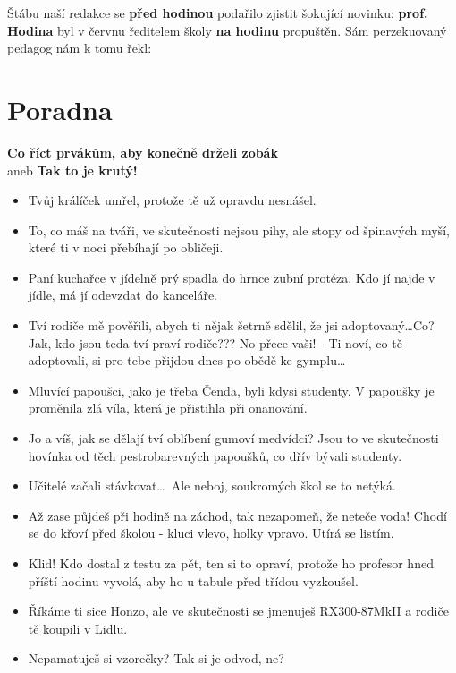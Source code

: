 \documentclass[twoside, 11pt]{article}
\begin{document}
Štábu naší redakce se \textbf{před hodinou} podařilo zjistit šokující novinku:
\textbf{prof. Hodina} byl v červnu ředitelem školy \textbf{na hodinu} propuštěn.
Sám perzekuovaný pedagog nám k tomu řekl: 

\section*{Poradna}
\textbf{Co říct prvákům, aby konečně drželi zobák}\\ aneb \textbf{Tak to je krutý!}
  
\begin{itemize}
    \item Tvůj králíček umřel, protože tě už opravdu nesnášel.
    \item To, co máš na tváři, ve skutečnosti nejsou pihy, ale stopy od špinavých myší, které ti v noci přebíhají po obličeji.
    \item Paní kuchařce v jídelně prý spadla do hrnce zubní protéza. Kdo jí najde v jídle, má jí
    odevzdat do kanceláře.
    \item Tví rodiče mě pověřili, abych ti nějak šetrně sdělil, že jsi adoptovaný\dots Co? Jak, kdo jsou
    teda tví praví rodiče??? No přece vaši! - Ti noví, co tě adoptovali, si pro tebe přijdou dnes
    po obědě ke gymplu\dots
    \item Mluvící papoušci, jako je třeba Čenda, byli kdysi studenty.
    V papoušky je proměnila zlá víla, která je přistihla při
    onanování.
    \item Jo a víš, jak se dělají tví oblíbení gumoví medvídci? Jsou
    to ve skutečnosti hovínka od těch pestrobarevných
    papoušků, co dřív bývali studenty.
    \item Učitelé začali stávkovat\dots ~Ale neboj, soukromých škol se
    to netýká.
    \item Až zase půjdeš při hodině na záchod, tak nezapomeň, že neteče voda! Chodí se do křoví
    před školou - kluci vlevo, holky vpravo. Utírá se listím.
    \item Klid! Kdo dostal z testu za pět, ten si to opraví, protože ho profesor hned příští hodinu
    vyvolá, aby ho u tabule před třídou vyzkoušel.
    \item Říkáme ti sice Honzo, ale ve skutečnosti se jmenuješ RX300-87MkII a rodiče tě koupili
    v Lidlu.
    \item Nepamatuješ si vzorečky? Tak si je odvoď, ne?
\end{itemize}
\end{document}
